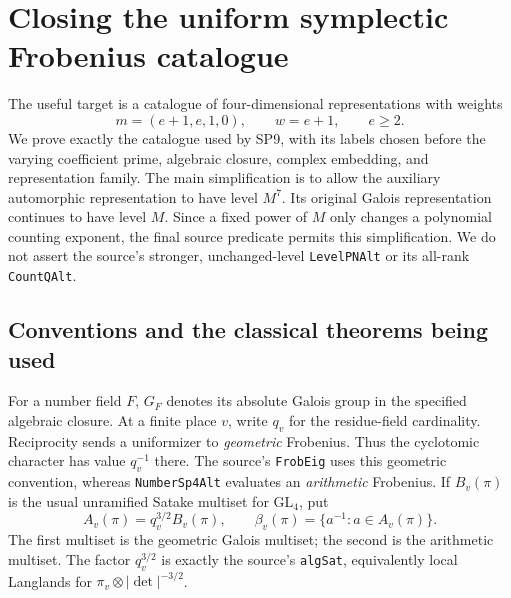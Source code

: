 \section{Closing the uniform symplectic Frobenius catalogue}
\label{sec:CX}


The useful target is a catalogue of four-dimensional
representations with weights
\[
 m=(e+1,e,1,0),\qquad w=e+1,\qquad e\ge2.                 \tag{CX.1}
\]
We prove exactly the catalogue used by SP9, with its labels chosen
before the varying coefficient prime, algebraic closure, complex
embedding, and representation family.  The main simplification is
to allow the auxiliary automorphic representation to have level
$M^7$.  Its original Galois representation continues to have level
$M$.  Since a fixed power of $M$ only changes a polynomial counting
exponent, the final source predicate permits this simplification.
We do not assert the source's stronger, unchanged-level
\texttt{LevelPNAlt} or its all-rank \texttt{CountQAlt}.

\subsection{Conventions and the classical theorems being used}

For a number field $F$, $G_F$ denotes its absolute Galois group in
the specified algebraic closure.  At a finite place $v$, write
$q_v$ for the residue-field cardinality.  Reciprocity sends a
uniformizer to \emph{geometric} Frobenius.  Thus the cyclotomic
character has value $q_v^{-1}$ there.  The source's
\texttt{FrobEig} uses this geometric convention, whereas
\texttt{NumberSp4Alt} evaluates an \emph{arithmetic} Frobenius.
If $B_v(\pi)$ is the usual unramified Satake multiset for
$\mathrm{GL}_4$, put
\[
 A_v(\pi)=q_v^{3/2}B_v(\pi),\qquad
 \beta_v(\pi)=\{a^{-1}:a\in A_v(\pi)\}.                \tag{CX.2}
\]
The first multiset is the geometric Galois multiset; the second is
the arithmetic multiset.  The factor $q_v^{3/2}$ is exactly the
source's \texttt{algSat}, equivalently local Langlands for
$\pi_v\otimes|\det|^{-3/2}$.

